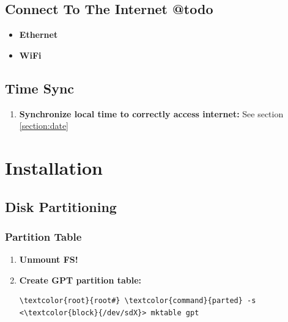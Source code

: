 \documentclass[10pt, a4paper, onecolumn, oneside, titlepage, openany]{book}
\begin{document}
\section{Connect To The Internet @todo}
\begin{itemize}
    \item \textbf{Ethernet}

    \item \textbf{WiFi}
\end{itemize}

\section{Time Sync}
\begin{enumerate}
    \item \textbf{Synchronize local time to correctly access internet:}
\newline See section \ref{section:date}
\end{enumerate}


\chapter{Installation}
\section{Disk Partitioning}
\subsection{Partition Table}
\begin{enumerate}
    \item \textbf{Unmount FS!}
    \item \textbf{Create GPT partition table:}
\begin{Verbatim}[commandchars=\\\{\}]
\textcolor{root}{root#} \textcolor{command}{parted} -s <\textcolor{block}{/dev/sdX}> mktable gpt
\end{Verbatim}
\end{enumerate}
\end{document}
